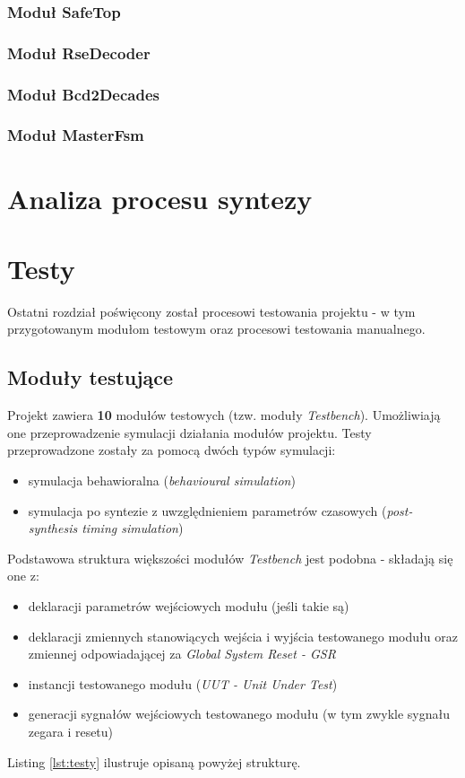 \documentclass[12pt] {article}
\begin{document}
\subsubsection{Moduł SafeTop}

\subsubsection{Moduł RseDecoder}

\subsubsection{Moduł Bcd2Decades}

\subsubsection{Moduł MasterFsm}



\section{Analiza procesu syntezy}



\section{Testy}
Ostatni rozdział poświęcony został procesowi testowania projektu - w tym przygotowanym modułom testowym oraz procesowi testowania manualnego. 

\subsection{Moduły testujące}
Projekt zawiera \textbf{10} modułów testowych (tzw. moduły \textit{Testbench}). Umożliwiają one przeprowadzenie symulacji działania modułów projektu. Testy przeprowadzone zostały za pomocą dwóch typów symulacji:
\begin{itemize}
\item symulacja behawioralna (\textit{behavioural simulation})
\item symulacja po syntezie z uwzględnieniem parametrów czasowych (\textit{post-synthesis timing simulation})
\end{itemize}
Podstawowa struktura większości modułów \textit{Testbench} jest podobna - składają się one z:
\begin{itemize}
\item deklaracji parametrów wejściowych modułu (jeśli takie są)
\item deklaracji zmiennych stanowiących wejścia i wyjścia testowanego modułu oraz zmiennej odpowiadającej za \textit{Global System Reset - GSR}
\item instancji testowanego modułu (\textit{UUT - Unit Under Test})
\item generacji sygnałów wejściowych testowanego modułu (w tym zwykle sygnału zegara i resetu)
\end{itemize}
Listing \ref{lst:testy} ilustruje opisaną powyżej strukturę.
\end{document}
